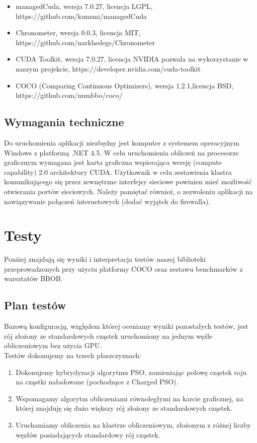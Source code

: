 \documentclass[12pt, twoside, openany, abstract=on]{report}
\theoremstyle{definition}
\begin{document}
\begin{itemize}
\item managedCuda, wersja 7.0.27, licencja LGPL, https://github.com/kunzmi/managedCuda
\item Chronometer, wersja 0.0.3, licencja MIT, https://github.com/narkhedegs/Chronometer
\item CUDA Toolkit, wersja 7.0.27, licencja NVIDIA pozwala na wykorzystanie w naszym projekcie, https://developer.nvidia.com/cuda-toolkit
\item COCO (Comparing Continuous Optimizers), wersja 1.2.1,licencja BSD, \\
https://github.com/numbbo/coco/
\end{itemize}

\section{Wymagania techniczne}

Do uruchomienia aplikacji niezbędny jest komputer z systemem operacyjnym Windows z
platformą .NET 4.5. W celu uruchomienia obliczeń na procesorze graficznym wymagana jest karta graficzna wspierająca wersję (compute capability) 2.0 architektury CUDA.
Użytkownik w celu zestawienia klastra komunikującego się przez zewnętrzne interfejsy sieciowe powinien mieć możliwość otwierania portów sieciowych. Należy pamiętać również, o zezwoleniu aplikacji na nawiązywanie połączeń internetowych (dodać wyjątek do firewalla).


\chapter{Testy}

Poniżej znajdują się wyniki i interpretacja testów naszej biblioteki przeprowadzonych przy użyciu platformy COCO oraz zestawu benchmarków z warsztatów BBOB.

\section{Plan testów}
Bazową konfiguracją, względem której oceniamy wyniki pozostałych testów, jest rój złożony ze standardowych cząstek uruchomiony na jednym węźle obliczeniowym bez użycia GPU.\\

Testów dokonujemy na trzech płaszczyznach:

\begin{enumerate}
\item{Dokonujemy hybrydyzacji algorytmu PSO, zamieniając połowę cząstek roju na cząstki naładowane (pochodzące z Charged PSO).}

\item{Wspomagamy algorytm obliczeniami równoległymi na karcie graficznej, na której znajduję się dużo większy rój złożony ze standardowych cząstek.}

\item{Uruchamiamy obliczenia na klastrze obliczeniowym, złożonym z różnej liczby węzłów posiadających standardowy rój cząstek.}
\end{enumerate}
\end{document}
